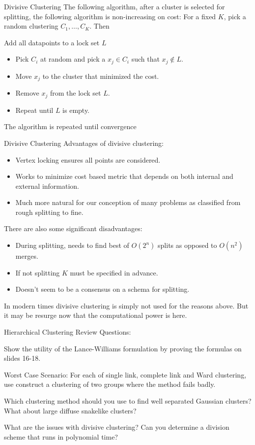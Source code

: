 \documentclass[10pt, table, dvipsnames,xcdraw, handout]{beamer}
\begin{document}
\begin{frame}[fragile]{Divisive Clustering}
The following algorithm, after a cluster is selected for splitting, the following algorithm is non-increasing on cost: For a fixed $K$, pick a random clustering $C_1,\ldots, C_K$. Then 

Add all datapoints to a lock set $L$
\begin{itemize}
\item[] Pick $C_i$ at random and pick a $x_j\in C_i$ such that $x_j\not\in L$.\pause
\item[] Move $x_j$ to the cluster that minimized the cost.\pause
\item[] Remove $x_j$ from the lock set $L$.\pause
\item[] Repeat until $L$ is empty. \pause
\end{itemize}
The algorithm is repeated until convergence

\end{frame}


\begin{frame}[fragile]{Divisive Clustering}
Advantages of divisive clustering:
\begin{itemize}
\item[] Vertex locking ensures all points are considered. \pause
\item[] Works to minimize cost based metric that depends on both internal and external information.\pause
\item[] Much more natural for our conception of many problems as classified from rough splitting to fine. \pause
\end{itemize}
There are also some significant disadvantages:
\begin{itemize}
\item[] During splitting, needs to find best of $O(2^n)$ splits as opposed to $O(n^2)$ merges. \pause
\item[] If not splitting $K$ must be specified in advance. \pause
\item[] Doesn't seem to be a consensus on a schema for splitting. \pause
\end{itemize}
In modern times divisive clustering is simply not used for the reasons above. But it may be resurge now that the computational power is here.
\end{frame}





\begin{frame}[fragile]{Hierarchical Clustering}
Review Questions:

Show the utility of the Lance-Williams formulation by proving the formulas on slides 16-18. 

Worst Case Scenario: For each of single link, complete link and Ward clustering, use construct a clustering of two groups where the method fails badly. 

Which clustering method should you use to find well separated Gaussian clusters? What about large diffuse snakelike clusters?

What are the issues with divisive clustering? Can you determine a division scheme that runs in polynomial time?
\end{frame}
\end{document}
